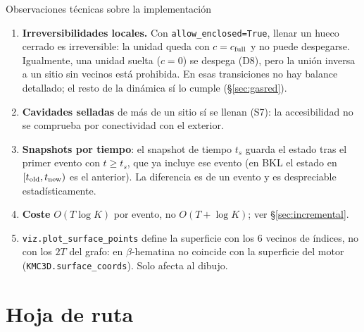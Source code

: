 \documentclass[11pt,a4paper]{article}
\newcommand{\code}[1]{\texttt{#1}}
\newcommand{\bh}{$\beta$-hematina}
\begin{document}
\begin{nota}{Observaciones técnicas sobre la implementación}
\begin{enumerate}[leftmargin=*]
\item \textbf{Irreversibilidades locales.} Con \code{allow\_enclosed=True}, llenar un hueco cerrado es
irreversible: la unidad queda con $c=c_{\rm full}$ y no puede despegarse. Igualmente, una unidad suelta
($c=0$) se despega (D8), pero la unión inversa a un sitio sin vecinos está prohibida. En esas transiciones
no hay balance detallado; el resto de la dinámica sí lo cumple (\S\ref{sec:gasred}).
\item \textbf{Cavidades selladas} de más de un sitio sí se llenan (S7): la accesibilidad no se comprueba
por conectividad con el exterior.
\item \textbf{Snapshots por tiempo}: el snapshot de tiempo $t_s$ guarda el estado tras el primer evento con
$t\ge t_s$, que ya incluye ese evento (en BKL el estado en $[t_{\rm old},t_{\rm new})$ es el anterior). La
diferencia es de un evento y es despreciable estadísticamente.
\item \textbf{Coste} $O(T\log K)$ por evento, no $O(T+\log K)$; ver \S\ref{sec:incremental}.
\item \code{viz.plot\_surface\_points} define la superficie con los 6 vecinos de índices, no con los $2T$
del grafo: en \bh{} no coincide con la superficie del motor (\code{KMC3D.surface\_coords}). Solo afecta
al dibujo.
\end{enumerate}
\end{nota}

\section{Hoja de ruta}
\label{sec:ruta}
\end{document}
